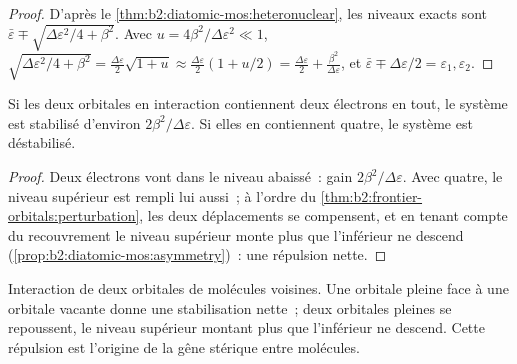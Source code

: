 \begin{proof}
D'après le \cref{thm:b2:diatomic-mos:heteronuclear}, les niveaux exacts sont $\bar\varepsilon \mp
\sqrt{\Delta\varepsilon^2/4 + \beta^2}$. Avec $u = 4\beta^2/\Delta\varepsilon^2 \ll 1$, $\sqrt{\Delta\varepsilon^2/4
+ \beta^2} = \frac{\Delta\varepsilon}{2}\sqrt{1 + u} \approx \frac{\Delta\varepsilon}{2}(1 + u/2) =
\frac{\Delta\varepsilon}{2} + \frac{\beta^2}{\Delta\varepsilon}$, et $\bar\varepsilon \mp \Delta\varepsilon/2 = \varepsilon_1,
\varepsilon_2$.
\end{proof}

\begin{proposition}\label{prop:b2:frontier-orbitals:four-electron}
Si les deux orbitales en interaction contiennent deux électrons en tout, le système est stabilisé
d'environ $2\beta^2/\Delta\varepsilon$. Si elles en contiennent quatre, le système est déstabilisé.
\end{proposition}

\begin{proof}
Deux électrons vont dans le niveau abaissé~: gain $2\beta^2/\Delta\varepsilon$. Avec quatre, le niveau supérieur
est rempli lui aussi~; à l'ordre du \cref{thm:b2:frontier-orbitals:perturbation}, les deux
déplacements se compensent, et en tenant compte du recouvrement le niveau supérieur monte plus que l'inférieur ne
descend (\cref{prop:b2:diatomic-mos:asymmetry})~: une répulsion nette.
\end{proof}

\begin{omfigure}

{\small Interaction de deux orbitales de molécules voisines. Une orbitale pleine
face à une orbitale vacante donne une stabilisation nette~; deux orbitales pleines se repoussent, le
niveau supérieur montant plus que l'inférieur ne descend. Cette répulsion est l'origine
de la gêne stérique entre molécules.}
\end{omfigure}

